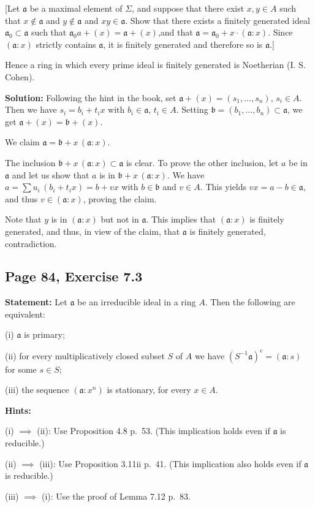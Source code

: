 \documentclass[parskip=half,fontsize=12pt]{scrartcl}%
\newcommand{\oo}{\operatorname}\newcommand{\ooo}{\operatorname*}
\newcommand{\mf}{\mathfrak}
\newcommand{\aaa}{\mf a}
\newcommand{\bbb}{\mf b}
\begin{document}
[Let $\aaa$ be a maximal element of $\Sigma$, and suppose that there exist $x,y\in A$ such that $x\notin\aaa$ and $y\notin\aaa$ and $xy\in\aaa$. Show that there exists a finitely generated ideal $\aaa_0\subset\aaa$ such that $\aaa_0a+(x)=\aaa+(x)$,and that $\aaa=\aaa_0+x\cdot(\aaa:x)$. Since $(\aaa:x)$ strictly contains $\aaa$, it is finitely generated and therefore so is $\aaa$.]

Hence a ring in which every prime ideal is finitely generated is Noetherian (I. S. Cohen).

\textbf{Solution:} Following the hint in the book, set $\aaa+(x)=(s_1,\dots,s_n)$, $s_i\in A$. Then we have $s_i=b_i+t_ix$ with $b_i\in\aaa$, $t_i\in A$. Setting $\bbb=(b_1,\dots,b_n)\subset\aaa$, we get $\aaa+(x)=\bbb+(x)$. 

We claim $\aaa=\bbb+x\,(\aaa:x)$. 

The inclusion $\bbb+x\,(\aaa:x)\subset\aaa$ is clear. To prove the other inclusion, let $a$ be in $\aaa$ and let us show that $a$ is in $\bbb+x\,(\aaa:x)$. We have $a=\sum u_i\,(b_i+t_ix)=b+vx$ with $b\in\bbb$ and $v\in A$. This yields $vx=a-b\in\aaa$, and thus $v\in(\aaa:x)$, proving the claim.

Note that $y$ is in $(\aaa:x)$ but not in $\aaa$. This implies that $(\aaa:x)$ is finitely generated, and thus, in view of the claim, that $\aaa$ is finitely generated, contradiction.

\subsection{Page 84, Exercise 7.3}%

\textbf{Statement:} Let $\aaa$ be an irreducible ideal in a ring $A$. Then the following are equivalent: 

(i) $\aaa$ is primary;

(ii) for every multiplicatively closed subset $S$ of $A$ we have $(S^{-1}\aaa)^{\oo c}=(\aaa:s)$ for some $s\in S$;

(iii) the sequence $(\aaa:x^n)$ is stationary, for every $x\in A$.

\textbf{Hints:} 

(i) $\implies$ (ii): Use %
Proposition 4.8 p.~53. (This implication holds even if $\aaa$ is reducible.)

(ii) $\implies$ (iii): Use Proposition 3.11ii p.~41. (This implication also holds even if $\aaa$ is reducible.)

(iii) $\implies$ (i): Use the proof of Lemma 7.12 p.~83.
\end{document}
